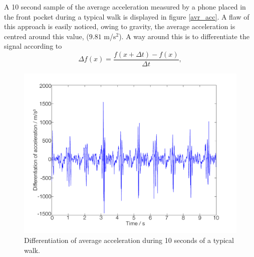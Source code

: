 \documentclass{LTHthesis}
\begin{document}
A 10 second sample of the average acceleration measured by a phone placed in the front pocket during a typical walk is displayed in figure \ref{avr_acc}. A flaw of this approach is easily noticed, owing to gravity, the average acceleration is centred around this value, ($9.81$ m/s$^2$). A way around this is to differentiate the signal according to 
%
\begin{equation}
\Delta f(x) = \frac{f(x+\Delta t) - f(x) }{\Delta t},
\end{equation} 
%
\begin{figure}[!hbt]

\includegraphics[width=1\textwidth ]{images/kinematic/avr_acc_dif}
\caption{Differentiation of average acceleration during 10 seconds of a typical walk.}\label{avr_acc_dif}
\end{figure}
\end{document}
